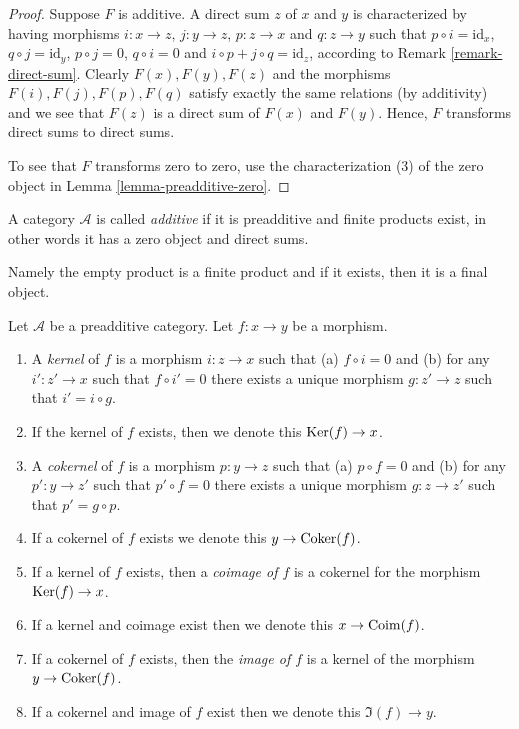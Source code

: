 \begin{proof}
Suppose $F$ is additive. A direct sum $z$
of $x$ and $y$ is characterized by having morphisms
$i : x \to z$, $j : y \to z$, $p : z \to x$ and
$q : z \to y$ such that $p \circ i = \text{id}_x$,
$q \circ j = \text{id}_y$, $p \circ j = 0$, $q \circ i = 0$
and $i \circ p + j \circ q = \text{id}_z$, according
to Remark \ref{remark-direct-sum}. Clearly $F(x), F(y), F(z)$
and the morphisms $F(i), F(j), F(p), F(q)$ satisfy exactly the
same relations (by additivity) and we see that $F(z)$ is
a direct sum of $F(x)$ and $F(y)$.
Hence, $F$ transforms direct sums to direct sums.

\medskip\noindent
To see that $F$ transforms zero to zero, use the
characterization (3) of the zero object in
Lemma \ref{lemma-preadditive-zero}.
\end{proof}

\begin{definition}
\label{definition-additive-category}
A category $\mathcal{A}$ is called {\it additive}
if it is preadditive and finite products exist, in other
words it has a zero object and direct sums.
\end{definition}

\noindent
Namely the empty product is a finite product and
if it exists, then it is a final object.

\begin{definition}
\label{definition-kernel}
Let $\mathcal{A}$ be a preadditive category.
Let $f : x \to y$ be a morphism.
\begin{enumerate}
\item A {\it kernel} of $f$ is a morphism
$i : z \to x$ such that (a) $f \circ i = 0$ and (b)
for any $i' : z' \to x$ such that $f \circ i' = 0$ there
exists a unique morphism $g : z' \to z$ such that
$i' = i \circ g$.
\item If the kernel of $f$ exists, then we denote
this $\mathop{\mathrm{Ker}}(f) \to x$.
\item A {\it cokernel} of $f$ is a morphism
$p : y \to z$ such that (a) $p \circ f = 0$ and (b)
for any $p' : y \to z'$ such that $p' \circ f = 0$ there
exists a unique morphism $g : z \to z'$ such that
$p' = g \circ p$.
\item If a cokernel of $f$ exists we denote this
$y \to \mathop{\mathrm{Coker}}(f)$.
\item If a kernel of $f$ exists, then a {\it coimage
of $f$} is a cokernel for the morphism $\mathop{\mathrm{Ker}}(f) \to x$.
\item If a kernel and coimage exist then we denote this
$x \to \mathop{\mathrm{Coim}}(f)$.
\item If a cokernel of $f$ exists, then the {\it image of
$f$} is a kernel of the morphism $y \to \mathop{\mathrm{Coker}}(f)$.
\item If a cokernel and image of $f$ exist then we denote
this $\Im(f) \to y$.
\end{enumerate}
\end{definition}

